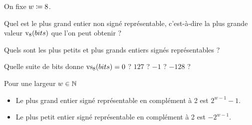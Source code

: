 \documentclass{magnolia}
\begin{document}
\begin{exoUnique}
  \exo
  On fixe $w \coloneqq 8$.
  \begin{questions}
    \item Quel est le plus grand entier non signé représentable, c'est-à-dire
          la plus grande valeur ${\rm v}_{8}(bits)$ que l'on peut obtenir ?
    \item Quels sont les plus petits et plus grands entiers signés
          représentables ?
    \item Quelle suite de bits donne ${\rm vs}_{8}(bits) = 0$ ? $127$ ?
          $-1$ ? $-128$ ?
  \end{questions}
\end{exoUnique}

\begin{proposition}
  Pour une largeur $w\in\mathbb{N}$
  \begin{itemize}
    \item Le plus grand entier signé représentable en complément à 2 est
          $2^{w - 1} - 1$.
    \item Le plus petit entier signé représentable en complément à 2 est
          $-2^{w - 1}$.
  \end{itemize}
\end{proposition}
\end{document}
